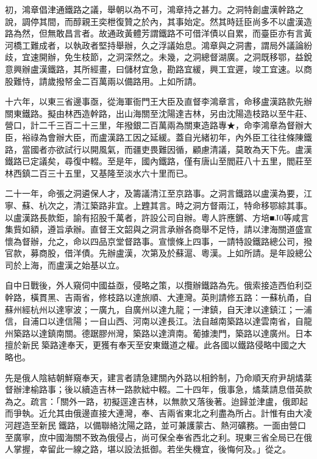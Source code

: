 \begin{pinyinscope}
初，鴻章倡津通鐵路之議，舉朝以為不可，鴻章持之甚力。之洞特創盧漢幹路之說，調停其間，而醇親王奕枻復贊之於內，其事始定。然其時廷臣尚多不以盧漢造路為然，但無敢昌言者。故通政黃體芳謂鐵路不可借洋債以自累，而臺臣亦有言黃河橋工難成者，以執政者堅持舉辦，久之浮議始息。鴻章與之洞書，謂局外議論紛歧，宜速開辦，免生枝節，之洞深然之。未幾，之洞總督湖廣。之洞既移鄂，益銳意興辦盧漢鐵路，其所經畫，曰儲材宜急，勘路宜緩，興工宜遲，竣工宜速。以商股難恃，請歲撥帑金二百萬兩以備路用。上如所請。

十六年，以東三省邊事亟，從海軍衙門王大臣及直督李鴻章言，命移盧漢路款先辦關東鐵路。擬由林西造幹路，出山海關至沈陽達吉林，另由沈陽造枝路以至牛莊、營口，計二千三百二十三里，年撥銀二百萬兩為關東造路專★，命李鴻章為督辦大臣，裕祿為會辦大臣，而盧漢路工因之延緩。蓋自光緒初年，內外臣工往往條陳鐵路，當國者亦欲試行以開風氣，而疆吏畏難因循，顧慮清議，莫敢為天下先。盧漢鐵路已定議矣，尋復中輟。至是年，國內鐵路，僅有唐山至閻莊八十五里，閻莊至林西鎮二百三十五里，又基隆至淡水六十里而已。

二十一年，命張之洞遴保人才，及籌議清江至京路事。之洞言鐵路以盧漢為要，江寧、蘇、杭次之，清江築路非宜。上韙其言。時之洞方督兩江，特命移鄂綜其事。以盧漢路長款鉅，諭有招股千萬者，許設公司自辦。粵人許應鏘、方培■J0等咸言集貲如額，遵旨承辦。直督王文韶與之洞言承辦各商舉不足恃，請以津海關道盛宣懷為督辦，允之，命以四品京堂督路事。宣懷條上四事，一請特設鐵路總公司，撥官款，募商股，借洋債。先辦盧漢，次第及於蘇滬、粵漢。上如所請。是年設總公司於上海，而盧漢之始基以立。

自中日戰後，外人窺伺中國益亟，侵略之策，以攬辦鐵路為先。俄索接造西伯利亞幹路，橫貫黑、吉兩省，修枝路以達旅順、大連灣。英則請修五路：一蘇杭甬，自蘇州經杭州以達寧波；一廣九，自廣州以達九龍；一津鎮，自天津以達鎮江；一浦信，自浦口以達信陽；一自山西、河南以達長江。法自越南築路以達雲南省，自龍州築路以達鎮南關。德踞膠州灣，築路以達濟南。葡據澳門，築路以達廣州。日本擅於新民築路達奉天，更獲有奉天至安東鐵道之權。此各國以鐵路侵略中國之大略也。

先是俄人陰結朝鮮窺奉天，建言者請急建關內外路以相鈐制，乃命順天府尹胡燏棻督辦津榆路事；後以續造吉林一路款絀中輟。二十四年，俄事急，燏棻請息借英款為之。疏言：「關外一路，初擬逕達吉林，以無款又落後著。迨歸並津盧，俄即起而爭執。近允其由俄邊直接大連灣，奉、吉兩省東北之利盡為所占。計惟有由大凌河趕造至新民鐵路，以備聯絡沈陽之路，並可兼護蒙古、熱河礦務。一面由營口至廣寧，庶中國海關不致為俄侵占，尚可保全奉省西北之利。現東三省全局已在俄人掌握，幸留此一線之路，堪以設法抵御。若坐失機宜，後悔何及。」從之。


\end{pinyinscope}
